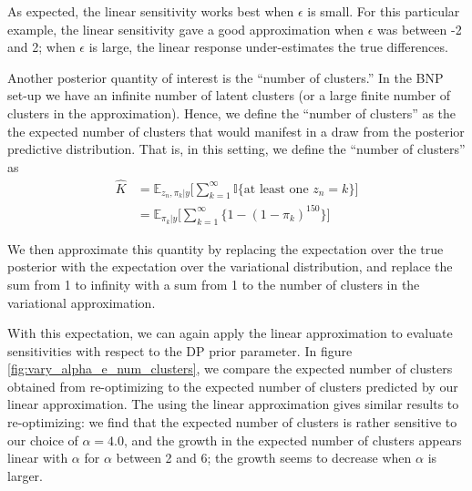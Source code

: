 \documentclass[a4paper]{article}
\begin{document}
As expected, the linear sensitivity works best when $\epsilon$ is small. For this particular
example, the linear sensitivity gave a good approximation when $\epsilon$ was between -2 and 2;
when $\epsilon$ is large, the linear response under-estimates the true differences.

Another posterior quantity of interest is the ``number of clusters.''
In the BNP set-up we have an infinite number of latent clusters (or a large
finite number of clusters in the approximation). Hence, we define the
``number of clusters'' as the the expected number of clusters that would manifest
in a draw from the posterior predictive distribution. That is, in this setting, we define the
``number of clusters'' as
\begin{align}
  \hat K &= \mathbb{E}_{z_n, \pi_k | y} \Big[\sum_{k = 1}^\infty \mathbb{I}\{\text{at least one $z_n = k$}\}\Big]\\
    &= \mathbb{E}_{\pi_k | y} \Big[\sum_{k = 1}^\infty \{1 - (1 - \pi_k)^{150}\} \Big]
		\label{eq:num_clusters}
\end{align}

We then approximate this quantity by replacing the expectation over the true posterior
with the expectation over the variational distribution, and replace the sum from 1 to infinity
with a sum from 1 to the number of clusters in the variational approximation.

With this expectation, we can again apply the linear approximation to evaluate sensitivities
with respect to the DP prior parameter. In figure \ref{fig:vary_alpha_e_num_clusters},
we compare the expected number of clusters obtained from re-optimizing
to the expected number of clusters predicted by our linear approximation.
The using the linear approximation gives similar results to re-optimizing: we find that the expected number of
clusters is rather sensitive to our choice of $\alpha = 4.0$, and the growth in
the expected number of clusters appears linear with $\alpha$ for $\alpha$ between 2 and 6;
the growth seems to decrease when $\alpha$ is larger.
\end{document}

